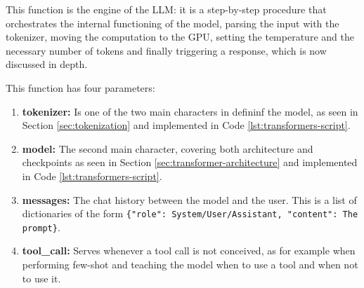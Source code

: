 This function is the engine of the LLM: it is a step-by-step procedure that orchestrates the internal functioning of the model, parsing the input with the tokenizer, moving the computation to the GPU, setting the temperature and the necessary number of tokens and finally triggering a response, which is now discussed in depth.

This function has four parameters:
\begin{enumerate}
    \item \textbf{tokenizer:} Is one of the two main characters in defininf the model, as seen in Section \ref{sec:tokenization} and implemented in Code \ref{lst:transformers-script}.
    \item \textbf{model:} The second main character, covering both architecture and checkpoints as seen in Section \ref{sec:transformer-architecture} and implemented in Code \ref{lst:transformers-script}.
    \item \textbf{messages:} The chat history between the model and the user. This is a list of dictionaries of the form \texttt{\{"role": System/User/Assistant, "content": The prompt\}}.
    \item \textbf{tool\_call:} Serves whenever a tool call is not conceived, as for example when performing few-shot and teaching the model when to use a tool and when not to use it.
\end{enumerate}

